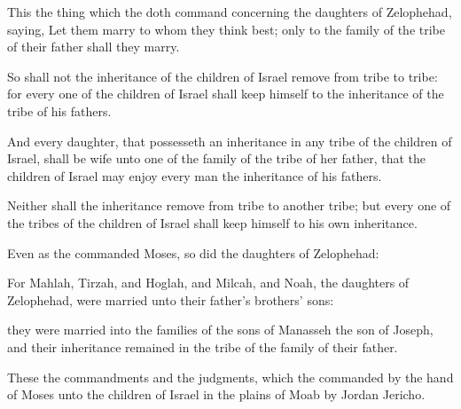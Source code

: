 {This
{} the
thing which the
{} doth
command concerning the
daughters of
Zelophehad,
saying, Let them
marry to whom they
think
best; only to the
family of the
tribe of their
father shall they
marry.

So shall not the
inheritance of the
children of
Israel
remove from
tribe to
tribe: for every
one of the
children of
Israel shall
keep himself to the
inheritance of the
tribe of his
fathers.

And every
daughter, that
possesseth an
inheritance in any
tribe of the
children of
Israel, shall be
wife unto
one of the
family of the
tribe of her
father, that the
children of
Israel may
enjoy every
man the
inheritance of his
fathers.

Neither shall the
inheritance
remove from
{}
tribe to
another
tribe; but every
one of the
tribes of the
children of
Israel shall
keep himself to his own
inheritance.

Even as the
{}
commanded
Moses, so
did the
daughters of
Zelophehad:

For
Mahlah,
Tirzah, and
Hoglah, and
Milcah, and
Noah, the
daughters of
Zelophehad, were
married unto their
father’s
brothers’ sons:

 they were
married into the
families of the
sons of
Manasseh the
son of
Joseph, and their
inheritance remained in the
tribe of the
family of their
father.

These
{} the
commandments and the
judgments, which the
{}
commanded by the
hand of
Moses unto the
children of
Israel in the
plains of
Moab by
Jordan
{}
Jericho.


\par }